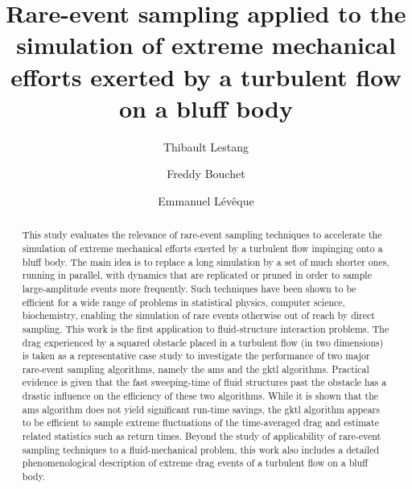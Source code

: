 \documentclass[pre,aps,floatfix,10pt,superscriptaddress, notitlepage,preprint]{revtex4-1}
\begin{document}
	
\title{Rare-event sampling applied to the simulation of extreme mechanical efforts exerted by a turbulent flow on a bluff body}

\author{Thibault Lestang}
\author{Freddy Bouchet}
\author{Emmanuel Lévêque}
	
	
	
\begin{abstract}
This study evaluates the relevance of rare-event sampling techniques to accelerate the simulation of extreme mechanical efforts exerted by a turbulent flow impinging onto a bluff body.
The main idea is to replace a long simulation by a set of much shorter ones, running in parallel, with dynamics that are replicated or pruned in order to sample large-amplitude events more frequently. 
%
Such techniques have been shown to be efficient for a wide range of problems in statistical physics, computer science, biochemistry, enabling the simulation of rare  events otherwise out of reach by direct sampling.
This work is the first application to fluid-structure interaction problems. 
%
The drag experienced by a squared obstacle placed in a turbulent flow (in two dimensions) is taken as a representative case study to investigate the performance of two major rare-event sampling algorithms, namely the \ac{ams} and the \ac{gktl} algorithms.
Practical evidence is given that the fast sweeping-time of fluid structures past the obstacle has a drastic influence on the efficiency of these two algorithms.
While it is shown that the \ac{ams} algorithm does not yield significant run-time savings, the \ac{gktl} algorithm appears to be efficient to sample extreme fluctuations of the time-averaged drag and estimate related statistics such as return times. 
%
Beyond the study of applicability of rare-event sampling techniques to a fluid-mechanical problem, this work also includes a detailed phenomenological description of extreme drag events of a turbulent flow on a bluff body. 
\end{abstract}
	
\end{document}
